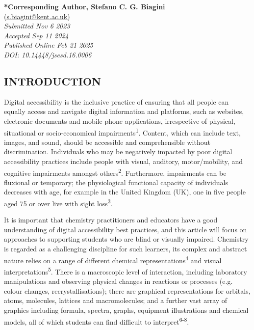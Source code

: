 \documentclass[11.5pt]{sig-alternate} %
\begin{document}
\textbf{*Corresponding Author, Stefano C. G. Biagini}\\ %
\href{mailto:s.biagini@kent.ac.uk}{(s.biagini@kent.ac.uk)} \\ %
\textit{Submitted Nov 6 2023} \\ %
\textit{Accepted Sep 11 2024} \\ %
\textit{Published Online Feb 21 2025} \\ %
\textit{DOI: 10.14448/jsesd.16.0006} \\ %
\pagebreak 
\clearpage %
\begin{large}
\section*{INTRODUCTION}
Digital accessibility is the inclusive practice of ensuring that all people can equally access and navigate digital information and platforms, such as websites, electronic documents and mobile phone applications, irrespective of physical, situational or socio-economical impairments\textsuperscript{1}. Content, which can include text, images, and sound, should be accessible and comprehensible without discrimination. Individuals who may be negatively impacted by poor digital accessibility practices include people with visual, auditory, motor/mobility, and cognitive impairments amongst others\textsuperscript{2}. Furthermore, impairments can be fluxional or temporary; the physiological functional capacity of individuals decreases with age, for example in the United Kingdom (UK), one in five people aged 75 or over live with sight loss\textsuperscript{3}.

It is important that chemistry practitioners and educators have a good understanding of digital accessibility best practices, and this article will focus on approaches to supporting students who are blind or visually impaired. Chemistry is regarded as a challenging discipline for such learners, its complex and abstract nature relies on a range of different chemical representations\textsuperscript{4} and visual interpretations\textsuperscript{5}. There is a macroscopic level of interaction, including laboratory manipulations and observing physical changes in reactions or processes (e.g. colour changes, recrystallisations); there are graphical representations for orbitals, atoms, molecules, lattices and macromolecules; and a further vast array of graphics including formula, spectra, graphs, equipment illustrations and chemical models, all of which students can find difficult to interpret\textsuperscript{6-8}. 


\end{large}
\end{document}
